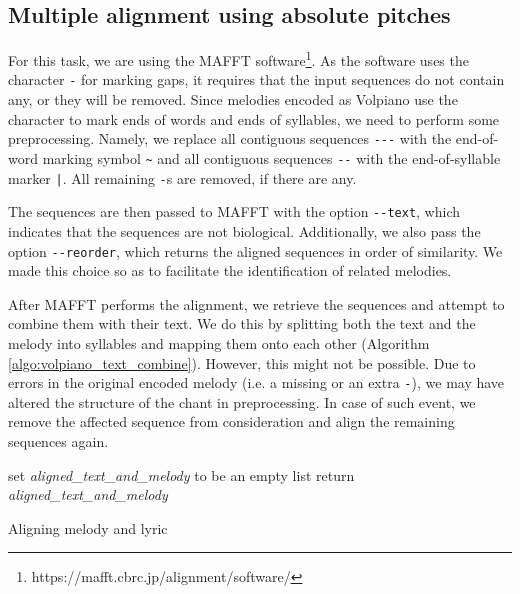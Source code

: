 \subsection{Multiple alignment using absolute pitches}

For this task, we are using the MAFFT software\footnote{https://mafft.cbrc.jp/alignment/software/}. As the software uses the character \verb|-| for marking gaps,
it requires that the input sequences do not contain any, or they will be removed. Since melodies encoded as Volpiano use the character to mark ends of words
and ends of syllables, we need to perform some preprocessing. Namely, we replace all contiguous sequences \verb|---| with the end-of-word marking symbol \verb|~|
and all contiguous sequences \verb|--| with the end-of-syllable marker \verb=|=. All remaining \verb|-|s are removed, if there are any.

The sequences are then passed to MAFFT with the option \verb|--text|, which indicates that the sequences are not biological. Additionally, we also pass the option
\verb|--reorder|, which returns the aligned sequences in order of similarity. We made this choice so as to facilitate the identification of related melodies.

After MAFFT performs the alignment, we retrieve the sequences and attempt to combine them with their text.
We do this by splitting both the text and the melody into syllables and mapping them onto each other (Algorithm \ref{algo:volpiano_text_combine}). 
However, this might not be possible. Due to errors in the original encoded melody (i.e. a missing or an extra \verb|-|),
we may have altered the structure of the chant in preprocessing. In case of such event, we remove the affected sequence from consideration and align the remaining
sequences again.\newline

\begin{algorithm}[H]
    \BlankLine
    set \emph{aligned\_text\_and\_melody} to be an empty list\;
    return \emph{aligned\_text\_and\_melody}\;
    \caption{Aligning melody and lyric}
    \label{algo:volpiano_text_combine}
\end{algorithm}

